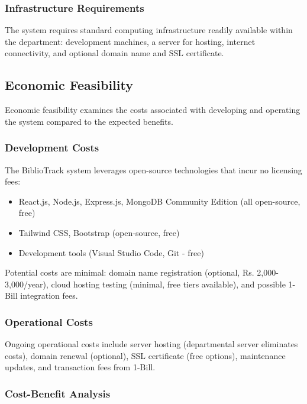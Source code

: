 \documentclass[12pt,a4paper]{report}
\begin{document}
\subsubsection{Infrastructure Requirements}

The system requires standard computing infrastructure readily available within the department: development machines, a server for hosting, internet connectivity, and optional domain name and SSL certificate.

\subsection{Economic Feasibility}
\label{subsec:economic}

Economic feasibility examines the costs associated with developing and operating the system compared to the expected benefits.

\subsubsection{Development Costs}
The BiblioTrack system leverages open-source technologies that incur no licensing fees:

\begin{itemize}
    \item React.js, Node.js, Express.js, MongoDB Community Edition (all open-source, free)
    \item Tailwind CSS, Bootstrap (open-source, free)
    \item Development tools (Visual Studio Code, Git - free)
\end{itemize}

Potential costs are minimal: domain name registration (optional, Rs. 2,000-3,000/year), cloud hosting testing (minimal, free tiers available), and possible 1-Bill integration fees.

\subsubsection{Operational Costs}

Ongoing operational costs include server hosting (departmental server eliminates costs), domain renewal (optional), SSL certificate (free options), maintenance updates, and transaction fees from 1-Bill.

\subsubsection{Cost-Benefit Analysis}
\end{document}
